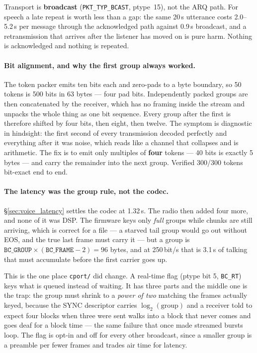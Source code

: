 Transport is \textbf{broadcast} (\texttt{PKT\_TYP\_BCAST}, ptype~15),
not the ARQ path.  For speech a late repeat is worth less than a gap:
the same 20\,s utterance costs 2.0--5.2\,s per message through the
acknowledged path against 0.9\,s broadcast, and a retransmission that
arrives after the listener has moved on is pure harm.  Nothing is
acknowledged and nothing is repeated.

\paragraph{Bit alignment, and why the first group always worked.}
The token packer emits ten bits each and zero-pads to a byte boundary,
so 50 tokens is 500 bits in 63 bytes --- four pad bits.  Independently
packed groups are then concatenated by the receiver, which has no
framing inside the stream and unpacks the whole thing as one bit
sequence.  Every group after the first is therefore shifted by four
bits, then eight, then twelve.  The symptom is diagnostic in hindsight:
the first second of every transmission decoded perfectly and everything
after it was noise, which reads like a channel that collapses and is
arithmetic.  The fix is to emit only multiples of \textbf{four} tokens
--- 40 bits is exactly 5 bytes --- and carry the remainder into the
next group.  Verified 300/300 tokens bit-exact end to end.

\paragraph{The latency was the group rule, not the codec.}
\S\ref{sec:voice_latency} settles the codec at 1.32\,s.  The radio then
added four more, and none of it was DSP\@.  The firmware keys only
\emph{full} groups while chunks are still arriving, which is correct
for a file --- a starved tail group would go out without EOS, and the
true last frame must carry it --- but a group is
$\texttt{BC\_GROUP}\times(\texttt{BC\_FRAME}-2) = 96$ bytes, and at
250\,bit/s that is 3.1\,s of talking that must accumulate before the
first carrier goes up.

This is the one place \texttt{cport/} did change.  A real-time flag
(ptype bit 5, \texttt{BC\_RT}) keys what is queued instead of waiting.
It has three parts and the middle one is the trap: the group must
shrink to a \emph{power of two} matching the frames actually keyed,
because the SYNC descriptor carries $\log_2(\text{group})$ and a
receiver told to expect four blocks when three were sent walks into a
block that never comes and goes deaf for a block time --- the same
failure that once made streamed bursts loop.  The flag is opt-in and
off for every other broadcast, since a smaller group is a preamble per
fewer frames and trades air time for latency.

